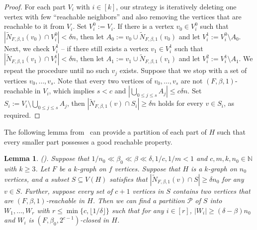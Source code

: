 \documentclass[11pt,a4paper]{article}
\newtheorem{lemma}[thm]{Lemma}
\theoremstyle{definition}
\begin{document}
\begin{proof}
For each part $V_i$ with $i\in [k]$, our strategy is iteratively deleting one vertex with few ``reachable neighbors'' and also removing the vertices that are reachable to it from $V_i$.
Set $V_{i}^0:=V_i$. If there is a vertex $v_0\in V_{i}^0$ such that $|\tilde{N}_{F, \beta , 1}(v_0)\cap V_{i}^0|<\delta n$, then let $A_0:=v_0\cup \tilde{N}_{F, \beta , 1}(v_0)$ and let $V_i^1:=V_i^0\setminus A_0$.
Next, we check $V_i^1$ -- if there still exists a vertex $v_1\in V_i^1$ such that $|\tilde{N}_{F, \beta , 1}(v_1)\cap V_i^1|<\delta n$, then let $A_1:=v_1\cup \tilde{N}_{F, \beta , 1}(v_1)$ and let $V_i^2:=V_i^1\setminus A_1$. We repeat the procedure until no such $v_j$ exists.
Suppose that we stop with a set of vertices $v_0,\dots, v_s$.
Note that every two vertices of $v_0,\dots, v_s$ are not $(F, \beta , 1)$-reachable in $V_i$, which implies $s< c$ and $|\bigcup _{0\leq j\leq s}A_j|\leq c\delta n$.
Set $S_i:=V_i\setminus \bigcup _{0\leq j\leq s}A_j $, then $|\tilde{N}_{F, \beta , 1}(v)\cap S_i|\geq \delta n$ holds for every $v\in S_i$, as required.
\end{proof}


The following lemma from~\cite{HT} can provide a partition of each part of $H$ such that every smaller part possesses a good reachable property.

\begin{lemma}{\rm{(}\cite[Theorem 6.3]{HT}\rm{)}}.
\label{partation}
Suppose that $1/n_0\ll \beta_0\ll \beta \ll \delta, 1/c, 1/m <1$ and $c,m,k, n_0 \in \mathbb{N}$ with $k\ge 3$.
 Let $F$ be a $k$-graph on $f$ vertices. Suppose that $H$ is a $k$-graph on $n_0$ vertices, and a subset $S\subseteq V(H)$ satisfies that $|\tilde{N}_{F, \beta , 1}(v)\cap S|\geq \delta n_0$ for any $v\in S$. Further, suppose every set of $c+1$ vertices in $S$ contains two vertices that are $(F, \beta , 1)$-reachable in $H$. Then we can find a partition $\mathcal{P}$ of $S$ into $W_1,\dots,W_r$ with $r \leq \min\{c,\lfloor1/{\delta}\rfloor\}$ such that for any $i \in [r]$, $|W_i|\geq (\delta -\beta )n_0$ and $W_i$ is $(F, \beta_0 , 2^{c-1})$-closed in $H$. 
\end{lemma}
\end{document}
